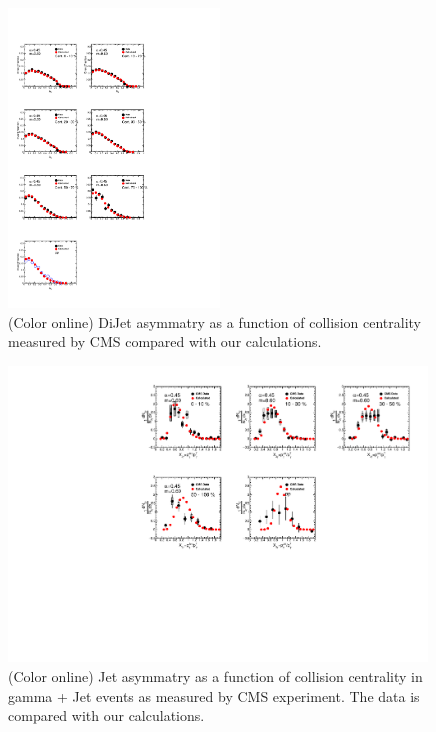 \documentclass[reprint,amsmath,amssymb,aps,showpacs,showkeys]{revtex4}
\begin{document}
\begin{figure}
  \includegraphics[width=0.5\textwidth]{Figures/Fig_Asym_DiJet_Centrality.pdf}
  \caption{(Color online) DiJet asymmatry as a function of collision centrality
    measured by CMS compared with our calculations.}
  \label{Fig:DiJetAsymCent}
\end{figure}



\begin{figure}
  \includegraphics[width=0.99\textwidth]{Figures/Fig_XJ_GammaJet_Centrality.pdf}
  \caption{(Color online) Jet asymmatry as a function of collision centrality
    in gamma + Jet events as measured by CMS experiment. The data is compared with our
    calculations.}
  \label{Fig:JetAsymGammaJetCent}
\end{figure}
\end{document}
